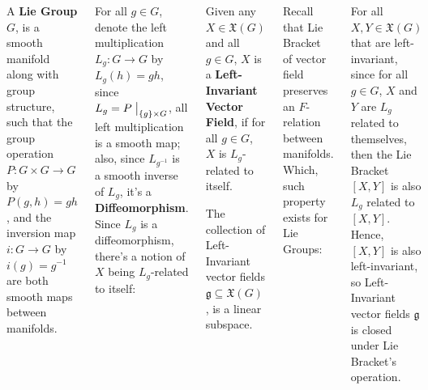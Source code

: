 \documentclass[20pt,,margin=1in,innermargin=-4.5in,blockverticalspace=-0.25in]{tikzposter}
\begin{document}
\begin{columns}
{        \begin{definitionBox}
            A \textbf{Lie Group} $G$, is a smooth manifold along with group structure, such that the group operation $P:G\times G\rightarrow G$ by $P(g,h) = gh$, and the inversion map $i:G\rightarrow G$ by $i(g)=g^{-1}$ are both smooth maps between manifolds.
        \end{definitionBox}

        For all $g\in G$, denote the left multiplication $L_g:G\rightarrow G$ by $L_g(h)=gh$,
        since $L_g = P\bigm|_{\{g\}\times G}$, all left multiplication is a smooth map; also, since $L_{g^{-1}}$ is a smooth inverse of $L_g$, it's a \textbf{Diffeomorphism}. 
        Since $L_g$ is a diffeomorphism, there's a notion of $X$ being $L_g$-related to itself:

        \begin{definitionBox}
            Given any $X\in\mathfrak{X}(G)$ and all $g\in G$, $X$ is a \textbf{Left-Invariant Vector Field}, if for all $g\in G$, $X$ is $L_g$-related to itself.

            The collection of Left-Invariant vector fields $\mathfrak{g}\subseteq \mathfrak{X}(G)$, is a linear subspace.
        \end{definitionBox}

        Recall that Lie Bracket of vector field preserves an $F$-relation between manifolds. Which, such property exists for Lie Groups:
        \begin{propertyBox}
            For all $X,Y\in\mathfrak{X}(G)$ that are left-invariant, since for all $g\in G$, $X$ and $Y$ are $L_g$ related to themselves, then the Lie Bracket $[X,Y]$ is also $L_g$ related to $[X,Y]$. Hence, $[X,Y]$ is also left-invariant, so Left-Invariant vector fields $\mathfrak{g}$ is closed under Lie Bracket's operation.
        \end{propertyBox}
    }

\end{columns}
\end{document}
